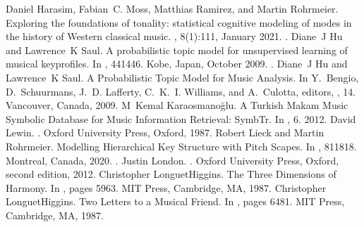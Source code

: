 \documentclass[letterpaper,10pt,english]{sphinxmanual}
\begin{document}
\begin{sphinxthebibliography}{10}
\sphinxAtStartPar
Daniel Harasim, Fabian C. Moss, Matthias Ramirez, and Martin Rohrmeier. Exploring the foundations of tonality: statistical cognitive modeling of modes in the history of Western classical music. , 8(1):1\textendash{}11, January 2021. .
\sphinxAtStartPar
Diane J Hu and Lawrence K Saul. A probabilistic topic model for unsupervised learning of musical key\sphinxhyphen{}profiles. In , 441\textendash{}446. Kobe, Japan, October 2009. .
\sphinxAtStartPar
Diane J Hu and Lawrence K Saul. A Probabilistic Topic Model for Music Analysis. In Y. Bengio, D. Schuurmans, J. D. Lafferty, C. K. I. Williams, and A. Culotta, editors, , 1\textendash{}4. Vancouver, Canada, 2009.
\sphinxAtStartPar
M Kemal Karaosmanoğlu. A Turkish Makam Music Symbolic Database for Music Information Retrieval: SymbTr. In , 6. 2012.
\sphinxAtStartPar
David Lewin. . Oxford University Press, Oxford, 1987.
\sphinxAtStartPar
Robert Lieck and Martin Rohrmeier. Modelling Hierarchical Key Structure with Pitch Scapes. In , 811\textendash{}818. Montreal, Canada, 2020. .
\sphinxAtStartPar
Justin London. . Oxford University Press, Oxford, second edition, 2012.
\sphinxAtStartPar
Christopher Longuet\sphinxhyphen{}Higgins. The Three Dimensions of Harmony. In , pages 59\textendash{}63. MIT Press, Cambridge, MA, 1987.
\sphinxAtStartPar
Christopher Longuet\sphinxhyphen{}Higgins. Two Letters to a Musical Friend. In , pages 64\textendash{}81. MIT Press, Cambridge, MA, 1987.

\end{sphinxthebibliography}
\end{document}
